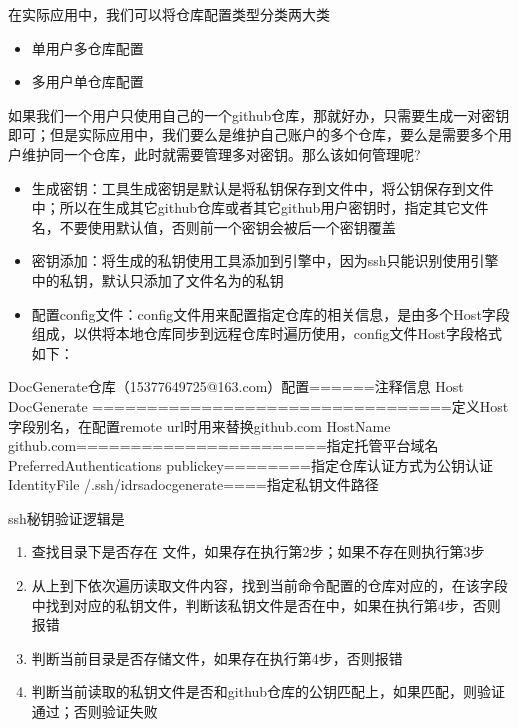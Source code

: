 \documentclass[a4paper,10pt,english]{sphinxmanual}
\begin{document}
在实际应用中，我们可以将仓库配置类型分类两大类
\begin{itemize}
\item {} 
单用户多仓库配置

\item {} 
多用户单仓库配置

\end{itemize}

如果我们一个用户只使用自己的一个github仓库，那就好办，只需要生成一对密钥即可；但是实际应用中，我们要么是维护自己账户的多个仓库，要么是需要多个用户维护同一个仓库，此时就需要管理多对密钥。那么该如何管理呢?
\begin{itemize}
\item {} 
生成密钥：工具生成密钥是默认是将私钥保存到文件中，将公钥保存到文件中；所以在生成其它github仓库或者其它github用户密钥时，指定其它文件名，不要使用默认值，否则前一个密钥会被后一个密钥覆盖

\item {} 
密钥添加：将生成的私钥使用工具添加到引擎中，因为ssh只能识别使用引擎中的私钥，默认只添加了文件名为的私钥

\item {} 
配置config文件：config文件用来配置指定仓库的相关信息，是由多个Host字段组成，以供将本地仓库同步到远程仓库时遍历使用，config文件Host字段格式如下：

\end{itemize}

\begin{sphinxVerbatim}[commandchars=\\\{\}]
\PYGZsh{} DocGenerate仓库（15377649725@163.com）配置======注释信息
Host DocGenerate =================================定义Host字段别名，在配置remote url时用来替换github.com
        HostName github.com=======================指定托管平台域名
        PreferredAuthentications publickey========指定仓库认证方式为公钥认证
        IdentityFile \PYGZti{}/.ssh/id\PYGZus{}rsa\PYGZus{}docgenerate====指定私钥文件路径
\end{sphinxVerbatim}

ssh秘钥验证逻辑是
\begin{enumerate}
\item {} 
查找目录下是否存在 文件，如果存在执行第2步；如果不存在则执行第3步

\item {} 
从上到下依次遍历读取文件内容，找到当前命令配置的仓库对应的，在该字段中找到对应的私钥文件，判断该私钥文件是否在中，如果在执行第4步，否则报错

\item {} 
判断当前目录是否存储文件，如果存在执行第4步，否则报错

\item {} 
判断当前读取的私钥文件是否和github仓库的公钥匹配上，如果匹配，则验证通过；否则验证失败

\end{enumerate}
\end{document}
